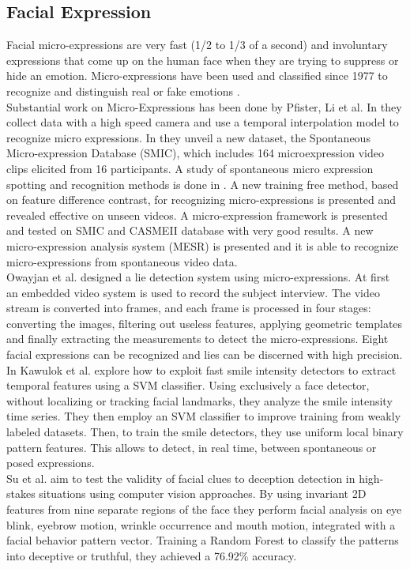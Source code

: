 \documentclass[LaM,binding=0.6cm,english,noexaminfo]{sapthesis}
\begin{document}
\subsection*{Facial Expression}
Facial micro-expressions are very fast (1/2 to 1/3 of a second) and involuntary expressions that come up on the human face when they are trying to suppress or hide an emotion. Micro-expressions have been used and classified since 1977 to recognize and distinguish real or fake emotions \cite{ekman}. \\
Substantial work on Micro-Expressions has been done by Pfister, Li et al. In \cite{pfister2011micro} they collect data with a high speed camera and use a temporal interpolation model to recognize micro expressions. In \cite{xli2012spontaneous} they unveil a new dataset, the Spontaneous
Micro-expression Database (SMIC), which includes 164 microexpression
video clips elicited from 16 participants. A study of spontaneous micro expression spotting and recognition methods is done in \cite{xli2015reading}. A new training free method, based on feature difference contrast, for recognizing micro-expressions is presented and revealed effective on unseen videos. A micro-expression framework is presented and tested on SMIC and CASMEII database with very good results. A new micro-expression analysis system (MESR) is presented and it is able to recognize micro-expressions from spontaneous video data. \\
Owayjan et al. \cite{6462897} designed a lie detection system using micro-expressions. At first an embedded video system is used to record the subject interview. The video stream is converted into frames, and each frame is processed in four stages: converting the images, filtering out useless features, applying geometric templates and finally extracting the measurements to detect the micro-expressions. Eight facial expressions can be recognized and lies can be discerned with high precision. \\
In \cite{10.1007/978-3-319-47955-2_27} Kawulok et al. explore how to exploit fast smile intensity detectors to extract temporal features using a SVM classifier. Using exclusively a face detector, without localizing or tracking facial landmarks, they analyze the smile intensity time series. They then employ an SVM classifier to improve training from weakly labeled datasets. Then, to train the smile detectors, they use uniform local binary pattern features. This allows to detect, in real time, between spontaneous or posed expressions. \\
Su et al. \cite{SU201652} aim to test the validity of facial clues to deception detection in high-stakes situations using computer vision approaches. By using invariant 2D features from nine separate regions of the face they perform facial analysis on eye blink, eyebrow motion, wrinkle occurrence and mouth motion, integrated with a facial behavior pattern vector. Training a Random Forest to classify the patterns into deceptive or truthful, they achieved a 76.92\% accuracy.
\end{document}
